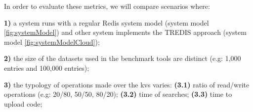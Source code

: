 In order to evaluate these metrics, we will compare scenarios where:

\textbf{1)} a system runs with a regular Redis system model (system model \ref{fig:systemModel}) and other system implements the TREDIS approach (system model \ref{fig:systemModelCloud});

\textbf{2)} the size of the datasets used in the benchmark tools are distinct (e.g: 1,000 entries and 100,000 entries);

\textbf{3)} the typology of operations made over the \gls{kvs} varies: \textbf{(3.1)} ratio of read/write operations (e.g: 20/80, 50/50, 80/20); \textbf{(3.2)} time of searches; \textbf{(3.3)} time to upload code;


% 
% 
% 
% 



